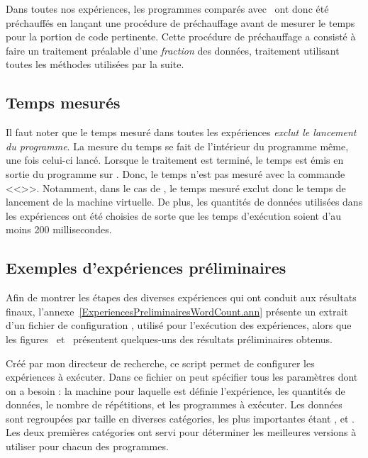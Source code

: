 Dans toutes nos exp\'eriences, les programmes  comparés avec \ppff\ ont donc \'et\'e pr\'echauff\'es en lan\c{c}ant une proc\'edure de pr\'echauffage avant de mesurer le temps pour la portion de code pertinente. Cette proc\'edure de pr\'echauffage a consisté à faire un traitement préalable d'une \emph{fraction} des données, traitement utilisant toutes les m\'ethodes utilis\'ees par la suite.

\subsection{Temps mesurés}
 
Il faut noter que le temps mesur\'e dans toutes les exp\'eriences \emph{exclut le lancement du programme}. La mesure du temps se fait de l'int\'erieur du programme m\^eme, une fois celui-ci lanc\'e. Lorsque le traitement est termin\'e, le temps est \'emis en sortie du programme sur . Donc, le temps n'est pas mesur\'e avec la commande <<>>. Notamment, dans le cas de , le temps mesuré exclut donc le temps de lancement de la machine virtuelle. De plus, les quantit\'es de donn\'ees utilis\'ees dans les exp\'eriences ont \'et\'e choisies de sorte que les temps d'ex\'ecution soient d'au moins 200 millisecondes.


\subsection{Exemples d'expériences préliminaires}



Afin de montrer les \'etapes des diverses exp\'eriences qui ont conduit aux r\'esultats finaux, l'annexe~\ref{ExperiencesPreliminairesWordCount.ann} pr\'esente un extrait d'un fichier de configuration , utilis\'e pour l'ex\'ecution des expériences, alors que les figures~ et~ présentent quelques-uns des r\'esultats préliminaires obtenus.

Cr\'e\'e par mon directeur de recherche, ce script permet de configurer les expériences \`a ex\'ecuter. Dans ce fichier on peut sp\'ecifier tous les param\`etres dont on a besoin : la machine pour laquelle est définie l'expérience, les quantités de donn\'ees, le nombre de r\'ep\'etitions, et les programmes \`a ex\'ecuter. Les donn\'ees sont regroup\'ees par taille en diverses cat\'egories, les plus importantes étant ,  et . Les deux premi\`eres cat\'egories ont servi pour d\'eterminer les meilleures versions \`a utiliser pour chacun des programmes. 

